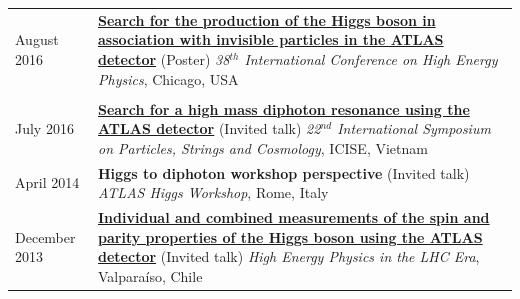 \documentclass{letter}
\begin{document}
\begin{tabular}{p{}p{}}
  August 2016
  &
  \href{https://cds.cern.ch/record/2208271}{\textbf{Search for the production of the Higgs boson in association with invisible particles in the ATLAS detector}} (Poster) \newline 
  \textit{38$^{th}$ International Conference on High Energy Physics}, Chicago, USA \\
  \\

  July 2016
  &
  \href{https://cds.cern.ch/record/2199807}{\textbf{Search for a high mass diphoton resonance using the ATLAS detector}} (Invited talk) \newline 
  \textit{22$^{nd}$ International Symposium on Particles, Strings and Cosmology}, ICISE, Vietnam \newline
  \\


  April 2014
  &
  \textbf{Higgs to diphoton workshop perspective} (Invited talk) \newline
  \textit{ATLAS Higgs Workshop}, Rome, Italy \newline
  \\

  December 2013
  &
  \href{https://cds.cern.ch/record/1640386}{\textbf{Individual and combined measurements of the spin and parity properties of the Higgs boson using the ATLAS detector}} (Invited talk) \newline
  \textit{High Energy Physics in the LHC Era}, Valpara\'{i}so, Chile \newline
  \\



\end{tabular}
\end{document}
